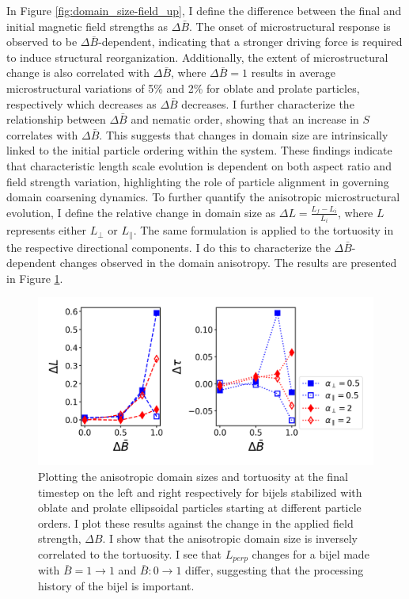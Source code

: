 In Figure \ref{fig:domain_size-field_up}, I define the difference
between the final and initial magnetic field strengths as
$\Delta \bar{B}$. The onset of microstructural response is observed to
be $\Delta \bar{B}$-dependent, indicating that a stronger driving
force is required to induce structural reorganization. Additionally, the
extent of microstructural change is also correlated with
$\Delta \bar{B}$, where $\Delta \bar{B} = 1$ results in average
microstructural variations of 5\% and 2\% for oblate and prolate
particles, respectively which decreases as $\Delta \bar{B}$ decreases.
I further characterize the relationship between $\Delta \bar{B}$ and
nematic order, showing that an increase in \(S\) correlates with
$\Delta \bar{B}$. This suggests that changes in domain size are
intrinsically linked to the initial particle ordering within the system.
These findings indicate that characteristic length scale evolution is
dependent on both aspect ratio and field strength variation,
highlighting the role of particle alignment in governing domain
coarsening dynamics. To further quantify the anisotropic microstructural
evolution, I define the relative change in domain size as
$\Delta L = \frac{L_{f} - L_{i}}{L_{i}}$, where $L$ represents
either $L_{\perp}$ or $L_{\parallel}$. The same formulation is
applied to the tortuosity in the respective directional components. I
do this to characterize the $\Delta \bar{B}$-dependent changes
observed in the domain anisotropy. The results are presented in Figure
\ref{fig:domain_size_aniso-field_up}.

\begin{figure} 
\centering 
\includegraphics[scale = 0.5]{../figures/results/paper2/domain_size_aniso-field_up.png} 
\caption{Plotting the anisotropic domain sizes and tortuosity at the final timestep on the left and right respectively for bijels stabilized with 
         oblate and prolate ellipsoidal particles starting at different particle orders. I plot these results against the change in the applied field 
         strength, $\Delta B$. I show that the anisotropic domain size is inversely correlated to the tortuosity. I see that $L_{perp}$ changes for 
         a bijel made with $\bar{B} = 1 \rightarrow 1$ and $\bar{B}: 0 \rightarrow 1$ differ, suggesting that the processing history of the bijel is important.} 
\label{fig:domain_size_aniso-field_up} 
\end{figure}

